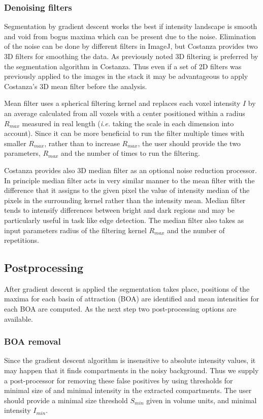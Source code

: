 \documentclass[a4paper,12pt]{article}
\begin{document}
\subsubsection{Denoising filters}
Segmentation by gradient descent works the best if intensity landscape is smooth and void from bogus maxima which can be present due to the noise. Elimination of the noise can be done by different
filters in ImageJ, but Costanza provides two 3D filters for
smoothing the data. As previously noted 3D filtering is preferred by the segmentation algorithm in Costanza. Thus even if a set of 2D filters was previously applied to the images in the stack it may be advantageous to apply Costanza's 3D mean filter before the analysis. 

Mean filter uses a spherical filtering kernel and replaces each voxel intensity
$I$ by an average calculated from all voxels with a center positioned
within a radius $R_{max}$ measured in real length (\textit{i.e.} taking the scale in each dimension into account). Since it can be
more beneficial to run the filter multiple times with smaller $R_{max}$, rather than to increase $R_{max}$,
the user should provide the two parameters, $R_{max}$ and the number
of times to run the filtering.

Costanza provides also 3D median filter as an optional noise reduction processor. In principle median filter acts in very similar manner to the mean filter with the difference that it assigns to the given pixel the value of intensity median of the pixels in the surrounding kernel rather than the intensity mean. Median filter tends to intensify differences between bright and dark regions and may be particularly useful in task like edge detection. The median filter also takes as input parameters radius of the filtering kernel $R_{max}$ and the number of repetitions.
\subsection{Postprocessing}
After gradient descent is applied the segmentation takes place, positions of the maxima for each basin of attraction (BOA) are  identified and mean intensities for each BOA are computed. As the next step two post-processing options
are available.

\subsubsection{BOA removal}
Since the gradient descent algorithm is insensitive to absolute intensity
values, it may happen that it finds compartments in the noisy
background. Thus we supply a post-processor for removing these false positives by
using thresholds for minimal size of and minimal intensity in the extracted
compartments. The user should provide a minimal size threshold $S_{min}$ given in volume
units, and minimal intensity $I_{min}$.
\end{document}
